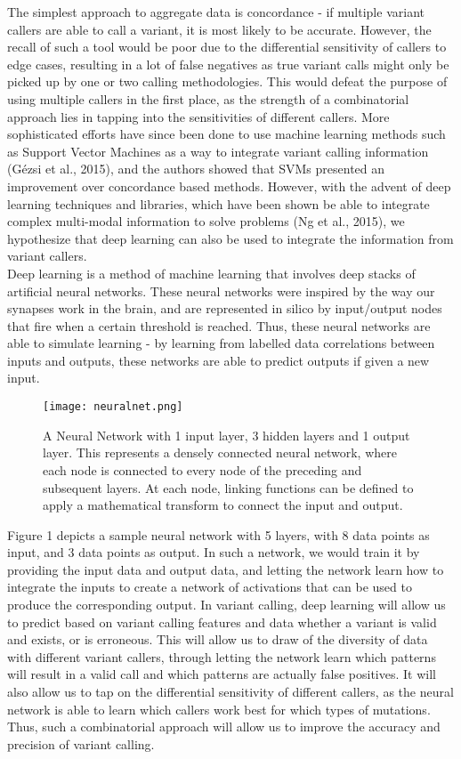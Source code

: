 \documentclass{article}
\begin{document}
The simplest approach to aggregate data is concordance - if multiple variant callers are able to call a variant, it is most likely to be accurate. However, the recall of such a tool would be poor due to the differential sensitivity of callers to edge cases, resulting in a lot of false negatives as true variant calls might only be picked up by one or two calling methodologies. This would defeat the purpose of using multiple callers in the first place, as the strength of a combinatorial approach lies in tapping into the sensitivities of different callers. More sophisticated efforts have since been done to use machine learning methods such as Support Vector Machines as a way to integrate variant calling information (Gézsi et al., 2015), and the authors showed that SVMs presented an improvement over concordance based methods. However, with the advent of deep learning techniques and libraries, which have been shown be able to integrate complex multi-modal information to solve problems (Ng et al., 2015), we hypothesize that deep learning can also be used to integrate the information from variant callers.\\

Deep learning is a method of machine learning that involves deep stacks of artificial neural networks. These neural networks were inspired by the way our synapses work in the brain, and are represented in silico by input/output nodes that fire when a certain threshold is reached. Thus, these neural networks are able to simulate learning - by learning from labelled data correlations between inputs and outputs, these networks are able to predict outputs if given a new input. 

\begin{figure}[H]
\texttt{[image: neuralnet.png]}
\centering
\caption{A Neural Network with 1 input layer, 3 hidden layers and 1 output layer. This represents a densely connected neural network, where each node is connected to every node of the preceding and subsequent layers. At each node, linking functions can be defined to apply a mathematical transform to connect the input and output.}
\end{figure}

Figure 1 depicts a sample neural network with 5 layers, with 8 data points as input, and 3 data points as output. In such a network, we would train it by providing the input data and output data, and letting the network learn how to integrate the inputs to create a network of activations that can be used to produce the corresponding output. In variant calling, deep learning will allow us to predict based on variant calling features and data whether a variant is valid and exists, or is erroneous. This will allow us to draw of the diversity of data with different variant callers, through letting the network learn which patterns will result in a valid call and which patterns are actually false positives. It will also allow us to tap on the differential sensitivity of different callers, as the neural network is able to learn which callers work best for which types of mutations. Thus, such a combinatorial approach will allow us to improve the accuracy and precision of variant calling.\\
\end{document}
